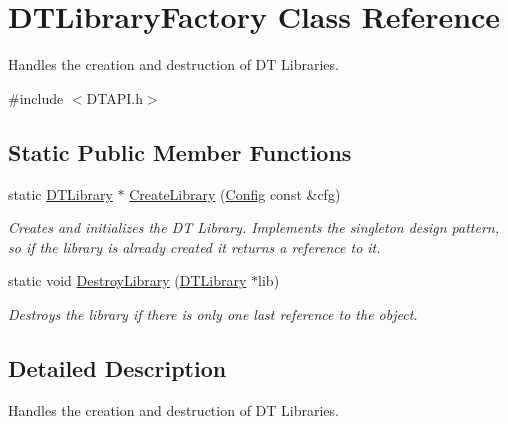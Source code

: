 \hypertarget{class_d_t_library_factory}{\section{D\-T\-Library\-Factory Class Reference}
\label{class_d_t_library_factory}
}


Handles the creation and destruction of D\-T Libraries.  




{\ttfamily \#include $<$D\-T\-A\-P\-I.\-h$>$}

\subsection*{Static Public Member Functions}
\begin{DoxyCompactItemize}
\item 
static \hyperlink{class_d_t_library}{D\-T\-Library} $\ast$ \hyperlink{class_d_t_library_factory_ab52622245da4d6c4adce2a63da510036}{Create\-Library} (\hyperlink{class_common_1_1_config}{Config} const \&cfg)
\begin{DoxyCompactList}\small\item\em Creates and initializes the D\-T Library. Implements the singleton design pattern, so if the library is already created it returns a reference to it. \end{DoxyCompactList}\item 
static void \hyperlink{class_d_t_library_factory_a4bb94d59eeb3fc6584e9b7c6324b7960}{Destroy\-Library} (\hyperlink{class_d_t_library}{D\-T\-Library} $\ast$lib)
\begin{DoxyCompactList}\small\item\em Destroys the library if there is only one last reference to the object. \end{DoxyCompactList}\end{DoxyCompactItemize}


\subsection{Detailed Description}
Handles the creation and destruction of D\-T Libraries. 

